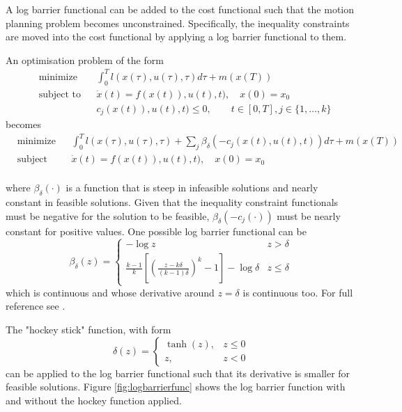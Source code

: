 \par A log barrier functional can be added to the cost functional such that the motion planning problem becomes unconstrained. Specifically, the inequality constraints are moved into the cost functional by applying a log barrier functional to them.
\par An optimisation problem of the form 
\begin{equation}
    \label{eq:opt_prob_without_log_bar}
    \begin{aligned}
    & \text{minimize} && \int_0^T l(x(\tau),u(\tau),\tau)d\tau + m(x(T)) \\
    & \text{subject to}  && \dot{x}(t) = f(x(t)),u(t),t),\quad x(0)=x_0 \\
        & && c_j(x(t)),u(t),t)\leq 0, \qquad t\in [0,T],j\in \{1,\dots,k \}
    \end{aligned}
\end{equation}
becomes
\begin{equation}
    \label{eq:opt_prob_with_log_bar}
    \begin{aligned}
    & \text{minimize} && \int_0^T l(x(\tau),u(\tau),\tau)+\sum_j \beta_\delta(-c_j(x(t),u(t),t))d\tau + m(x(T)) \\
    & \text{subject to}  && \dot{x}(t) = f(x(t)),u(t),t),\quad x(0)=x_0 \\
    \end{aligned}
\end{equation}

where $\beta_\delta(\cdot)$ is a function that is steep in infeasible solutions and nearly constant in feasible solutions. Given that the inequality constraint functionals must be negative for the solution to be feasible, $\beta_\delta(-c_j(\cdot))$ must be nearly constant for positive values. One possible log barrier functional can be
\begin{equation}
    \beta_\delta (z) = 
    \begin{cases}
        -\log{} z & z>\delta \\
        \frac{k-1}{k}\left[\left(\frac{z-k\delta}{(k-1)\delta}\right)^k-1\right]-\log{}\delta & z\leq \delta
    \end{cases}
\end{equation}
which is continuous and whose derivative around $z=\delta$ is continuous too. For full reference see \cite{hauser2006barrier}.
\par The "hockey stick" function, with form
\begin{equation}
    \delta(z)= \begin{cases}
        \tanh(z), & z\leq 0 \\
        z, & z<0
    \end{cases}
\end{equation}
can be applied to the log barrier functional such that its derivative is smaller for feasible solutions. Figure \ref{fig:logbarrierfunc} shows the log barrier function with and without the hockey function applied.

